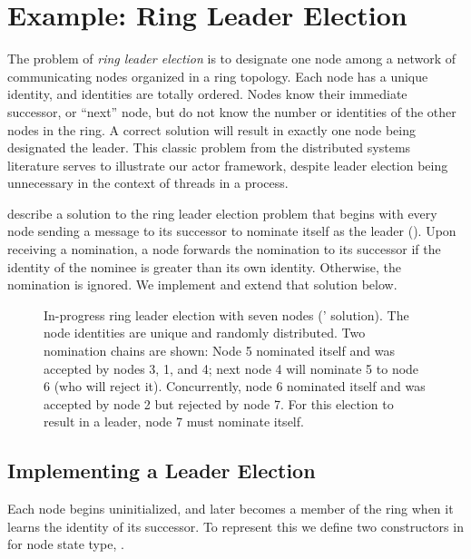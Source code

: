 \documentclass[sigplan,screen]{acmart}
\begin{document}
\section{Example: Ring Leader Election}
\label{sec:ring-impl}

The problem of \emph{ring leader election} is to designate one node
among a network of communicating nodes organized in a ring topology.
%
Each node has a unique identity, and identities are totally ordered.
%
Nodes know their immediate successor, or ``next'' node, but do not know the
number or identities of the other nodes in the ring.
%
A correct solution will result in exactly one node being designated the leader.
%
This classic problem from the distributed
systems literature serves to illustrate our actor framework,
despite leader election being unnecessary in the context of threads in a process.

\citet{chang1979decentralextrema} describe a solution to the ring leader election problem that begins with every
node sending a message to its successor to nominate itself as the leader
().
%
Upon receiving a nomination,
a node forwards the nomination to its successor
if the identity of the nominee is
greater than its own identity.
%
Otherwise, the nomination is ignored.
%
We implement and extend that solution below.

\begin{figure}

\caption{
    In-progress ring leader election with seven nodes
    (\citeauthor{chang1979decentralextrema}'
    \citeyear{chang1979decentralextrema} solution).
    The node identities are unique and randomly distributed.
    Two nomination chains are shown:
    Node 5 nominated itself and was accepted by nodes 3, 1, and 4; next node 4
    will nominate 5 to node 6 (who will reject it).
    Concurrently, node 6 nominated itself and was accepted by node 2 but
    rejected by node 7.
    For this election to result in a leader, node 7 must nominate itself.
}
\label{fig:ring-election-visual}
\end{figure}

\subsection{Implementing a Leader Election}




Each node begins uninitialized, and later becomes a member of the ring when
it learns the identity of its successor.
%
To represent this we define two constructors in  for node
state type, .
\end{document}
